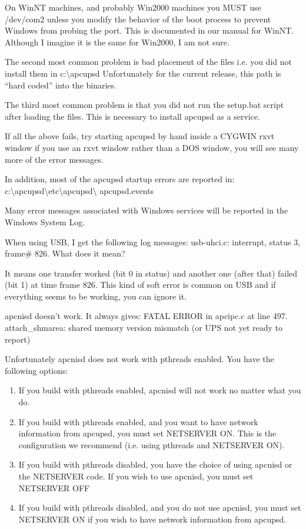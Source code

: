 {{{{{{{{{\begin{description}
{{{On WinNT machines, and probably Win2000 machines you MUST use /dev/com2 unless
you modify the behavior of the boot process to prevent Windows from probing
the port. This is documented in our manual for WinNT. Although I imagine it is
the same for Win2000, I am not sure.  

The second most common problem is bad placement of the files i.e. you did not
install them in c:\textbackslash{}apcupsd Unfortunately for the current
release, this path is ``hard coded'' into the binaries.  

The third most common problem is that you did not run the setup.bat script
after loading the files. This is necessary to install apcupsd as a service.  

If all the above fails, try starting apcupsd by hand inside a CYGWIN rxvt
window if you use an rxvt window rather than a DOS window, you will see many
more of the error messages.  

In addition, most of the apcupsd startup errors are reported in:
c:\textbackslash{}apcupsd\textbackslash{}etc\textbackslash{}apcupsd\textbackslash
{}apcupsd.events  

Many error messages associated with Windows services will be reported in the
Windows System Log.  

\item [Q:]
   When using USB, I get the following log messages: usb-uhci.c: interrupt,
status 3, frame\# 826. What does it mean?  

\item [A:]
   It means one transfer worked (bit 0 in status) and another one (after that)
failed (bit 1) at time frame 826. This kind of soft error is common on USB and
if everything seems to be working, you can ignore it.  

\item [Q:]
   apcnisd doesn't work. It always gives: FATAL ERROR in apcipc.c at line 497.
attach\_shmarea: shared memory version mismatch (or UPS not yet ready to
report)  

\item [A:]
   Unfortunately apcnisd does not work with pthreads enabled. You have the
following options:  

\begin{enumerate}
\item If you build with pthreads enabled, apcnisd will not work no matter what
   you do.  
\item If you build with pthreads enabled, and you want to have network
   information from apcupsd, you must set NETSERVER ON. This is the configuration
   we recommend (i.e. using pthreads and NETSERVER ON).  
\item If you build with pthreads disabled, you have the choice of using
   apcnisd or the NETSERVER code. If you wish to use apcnisd, you must set
   NETSERVER OFF  
\item If you build with pthreads disabled, and you do not use apcnisd, you
   must set NETSERVER ON if you wish to have network information from apcupsd.  
   \end{enumerate}

}}}
\end{description}}}}}}}}}}
